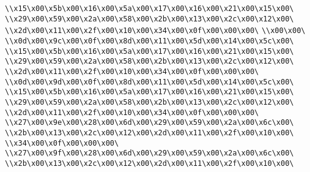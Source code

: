 \verb|\\x15\x00\x5b\x00\x16\x00\x5a\x00\x17\x00\x16\x00\x21\x00\x15\x00\|\newline
\verb|\\x29\x00\x59\x00\x2a\x00\x58\x00\x2b\x00\x13\x00\x2c\x00\x12\x00\|\newline
\verb|\\x2d\x00\x11\x00\x2f\x00\x10\x00\x34\x00\x0f\x00\x00\x00\|\newline
\verb|\\x00\x00\|\newline
\verb|\\x0d\x00\x9c\x00\x0f\x00\x8d\x00\x11\x00\x5d\x00\x14\x00\x5c\x00\|\newline
\verb|\\x15\x00\x5b\x00\x16\x00\x5a\x00\x17\x00\x16\x00\x21\x00\x15\x00\|\newline
\verb|\\x29\x00\x59\x00\x2a\x00\x58\x00\x2b\x00\x13\x00\x2c\x00\x12\x00\|\newline
\verb|\\x2d\x00\x11\x00\x2f\x00\x10\x00\x34\x00\x0f\x00\x00\x00\|\newline
\verb|\\x0d\x00\x9d\x00\x0f\x00\x8d\x00\x11\x00\x5d\x00\x14\x00\x5c\x00\|\newline
\verb|\\x15\x00\x5b\x00\x16\x00\x5a\x00\x17\x00\x16\x00\x21\x00\x15\x00\|\newline
\verb|\\x29\x00\x59\x00\x2a\x00\x58\x00\x2b\x00\x13\x00\x2c\x00\x12\x00\|\newline
\verb|\\x2d\x00\x11\x00\x2f\x00\x10\x00\x34\x00\x0f\x00\x00\x00\|\newline
\verb|\\x27\x00\x9e\x00\x28\x00\x6d\x00\x29\x00\x59\x00\x2a\x00\x6c\x00\|\newline
\verb|\\x2b\x00\x13\x00\x2c\x00\x12\x00\x2d\x00\x11\x00\x2f\x00\x10\x00\|\newline
\verb|\\x34\x00\x0f\x00\x00\x00\|\newline
\verb|\\x27\x00\x9f\x00\x28\x00\x6d\x00\x29\x00\x59\x00\x2a\x00\x6c\x00\|\newline
\verb|\\x2b\x00\x13\x00\x2c\x00\x12\x00\x2d\x00\x11\x00\x2f\x00\x10\x00\|\newline
